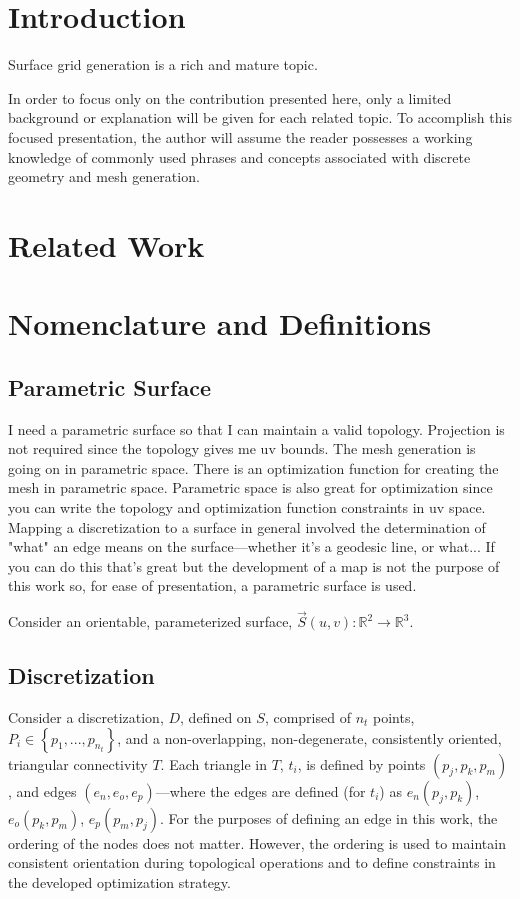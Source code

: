 \documentclass[11pt]{article}
\begin{document}
\section{Introduction}
Surface grid generation is a rich and mature topic.

In order to focus only on the contribution presented here, only a
limited background or explanation will be given for each related topic.
To accomplish this focused presentation, the author will assume the
reader possesses a working knowledge of commonly used phrases and
concepts associated with discrete geometry and mesh generation.

\section{Related Work}

\section{Nomenclature and Definitions}
\subsection{Parametric Surface}
I need a parametric surface so that I can maintain a valid topology.
Projection is not required since the topology gives me uv bounds. The
mesh generation is going on in parametric space. There is an
optimization function for creating the mesh in parametric space. Parametric
space is also great for optimization since you can write the topology
and optimization function constraints in uv space. Mapping a
discretization to a surface in general involved the determination of
"what" an edge means on the surface---whether it's a geodesic line, or
what... If you can do this that's great but the development of a map
is not the purpose of this work so, for ease of presentation, a
parametric surface is used.

Consider an orientable, parameterized surface, $\vec{S}\left(u,v\right)
: {\mathbb R}^2 \rightarrow {\mathbb R}^3$.

\subsection{Discretization}
Consider a discretization, $D$, defined on $S$, comprised of $n_t$
points, $P_i \in \left\{p_1,...,p_{n_t} \right\}$, and a
non-overlapping, non-degenerate, consistently oriented, triangular
connectivity $T$. Each triangle in $T$, $t_i$, is defined by points
$\left(p_j, p_k, p_m\right)$, and edges $\left(e_n, e_o,
e_p\right)$---where the edges are defined (for $t_i$) as $e_n
\left(p_j, p_k\right)$, $e_o \left(p_k, p_m\right)$, $e_p \left(p_m,
p_j\right)$. For the purposes of defining an edge in this work, the
ordering of the nodes does not matter. However, the ordering is used to
maintain consistent orientation during topological operations and to
define constraints in the developed optimization strategy.
\end{document}
